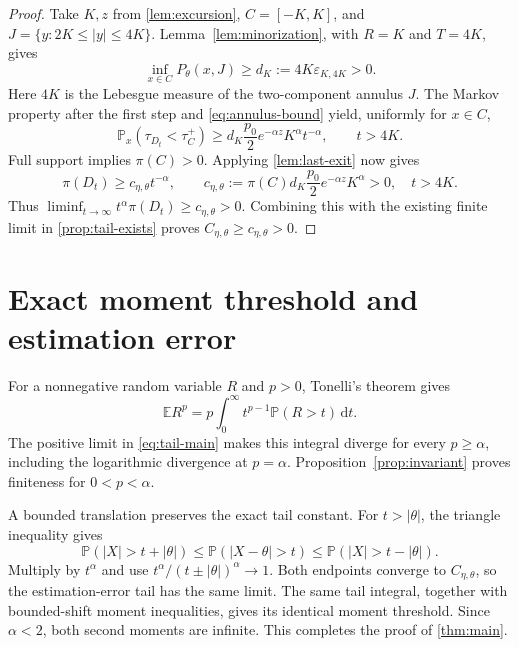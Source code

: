 \documentclass[11pt,a4paper]{article}
\numberwithin{equation}{section}
\theoremstyle{remark}
\newcommand{\E}{\mathbb E}
\newcommand{\Pp}{\mathbb P}
\newcommand{\dd}{\,\mathrm d}
\begin{document}
\begin{proof}
Take $K,z$ from \cref{lem:excursion}, $C=[-K,K]$, and
$J=\{y:2K\le|y|\le4K\}$. Lemma~\ref{lem:minorization}, with
$R=K$ and $T=4K$, gives
\begin{equation}
 \inf_{x\in C}P_\theta(x,J)
 \ge d_K:=4K\varepsilon_{K,4K}>0.\label{eq:compact-annulus}
\end{equation}
Here $4K$ is the Lebesgue measure of the two-component annulus $J$.
The Markov property after the first step and \eqref{eq:annulus-bound}
yield, uniformly for $x\in C$,
\begin{equation}
 \Pp_x(\tau_{D_t}<\tau_C^+)
 \ge d_K\frac{p_0}{2}e^{-\alpha z}K^\alpha t^{-\alpha},
 \qquad t>4K.\label{eq:central-excursion}
\end{equation}
Full support implies $\pi(C)>0$. Applying \cref{lem:last-exit} now gives
\begin{equation}
 \pi(D_t)\ge c_{\eta,\theta}t^{-\alpha},\qquad
 c_{\eta,\theta}:=\pi(C)d_K\frac{p_0}{2}e^{-\alpha z}K^\alpha>0,
 \quad t>4K.\label{eq:positive-lower-limit}
\end{equation}
Thus $\liminf_{t\to\infty}t^\alpha\pi(D_t)\ge c_{\eta,\theta}>0$.
Combining this with the existing finite limit in
\cref{prop:tail-exists} proves
$C_{\eta,\theta}\ge c_{\eta,\theta}>0$.
\end{proof}

\section{Exact moment threshold and estimation error}\label{sec:moments}

For a nonnegative random variable $R$ and $p>0$, Tonelli's theorem gives
\begin{equation}
 \E R^p=p\int_0^\infty t^{p-1}\Pp(R>t)\dd t.
 \label{eq:tail-moment}
\end{equation}
The positive limit in \eqref{eq:tail-main} makes this integral diverge
for every $p\ge\alpha$, including the logarithmic divergence at
$p=\alpha$. Proposition~\ref{prop:invariant} proves finiteness for
$0<p<\alpha$.

A bounded translation preserves the exact tail constant. For $t>|\theta|$,
the triangle inequality gives
\begin{equation}
 \Pp(|X|>t+|\theta|)
 \le\Pp(|X-\theta|>t)
 \le\Pp(|X|>t-|\theta|).\label{eq:shift-sandwich}
\end{equation}
Multiply by $t^\alpha$ and use
$t^\alpha/(t\pm|\theta|)^\alpha\to1$. Both endpoints converge to
$C_{\eta,\theta}$, so the estimation-error tail has the same limit.
The same tail integral, together with bounded-shift moment inequalities,
gives its identical moment threshold. Since $\alpha<2$, both second
moments are infinite. This completes the proof of \cref{thm:main}.
\end{document}

